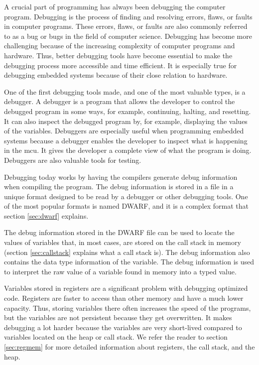 A crucial part of programming has always been debugging the computer program.
Debugging is the process of finding and resolving errors, flaws, or faults in computer programs.
These errors, flaws, or faults are also commonly referred to as a bug or bugs in the field of computer science.
Debugging has become more challenging because of the increasing complexity of computer programs and hardware.
Thus, better debugging tools have become essential to make the debugging process more accessible and time efficient.
It is especially true for debugging embedded systems because of their close relation to hardware.


One of the first debugging tools made, and one of the most valuable types, is a debugger.
A debugger is a program that allows the developer to control the debugged program in some ways, for example, continuing, halting, and resetting.
It can also inspect the debugged program by, for example, displaying the values of the variables.
Debuggers are especially useful when programming embedded systems because a debugger enables the developer to inspect what is happening in the \gls{mcu}.
It gives the developer a complete view of what the program is doing.
Debuggers are also valuable tools for testing.


Debugging today works by having the compilers generate debug information when compiling the program.
The debug information is stored in a file in a unique format designed to be read by a debugger or other debugging tools.
One of the most popular formats is named 
\gls{DWARF}, and it is a complex format that section \ref{sec:dwarf} explains.


The debug information stored in the \gls{DWARF} file can be used to locate the values of variables that, in most cases, are stored on the call stack in memory (section \ref{sec:callstack} explains what a call stack is).
The debug information also contains the data type information of the variable.
The debug information is used to interpret the raw value of a variable found in memory into a typed value.


Variables stored in registers are a significant problem with debugging optimized code.
Registers are faster to access than other memory and have a much lower capacity.
Thus, storing variables there often increases the speed of the programs, but the variables are not persistent because they get overwritten.
It makes debugging a lot harder because the variables are very short-lived compared to variables located on the heap or call stack.
We refer the reader to section \ref{sec:regmem} for more detailed information about registers, the call stack, and the heap.


